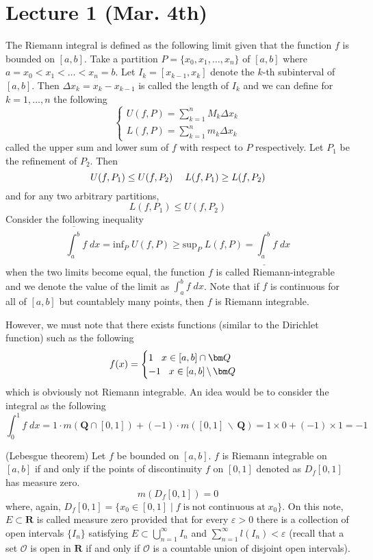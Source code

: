 \section{Lecture 1 (Mar. 4th)}
\begin{recall}
	The Riemann integral is defined as the following limit given that the function $f$ is bounded on $[a,b]$. Take a partition $P=\{x_0,x_1,\ldots ,x_{n}\}$ of $[a,b]$ where $a=x_0<x_1<\ldots <x_{n}=b$. Let $I_{k}=[x_{k-1},x_{k}]$ denote the $k$-th subinterval of $[a,b]$. Then $\Delta x_{k}=x_{k}-x_{k-1}$ is called the length of $I_{k}$ and we can define for $k=1,\ldots  ,n$ the following
\[\begin{cases}
U(f,P)=\sum_{k=1}^{n}M_{k}\Delta x_{k}\\
L(f,P)=\sum _{k=1}^{n}m_{k}\Delta x_{k}
\end{cases}\]
called the upper sum and lower sum of $f$ with respect to $P$ respectively. Let $P_1$ be the refinement of $P_2$. Then 
\[U(f,P_1)\leq U(f,P_2)\hspace{3ex}L(f,P_1)\geq L(f,P_2)\]
and for any two arbitrary partitions,
\[L(f,P_1)\leq U(f,P_2)\]
Consider the following inequality
\[\overline{\int_{a}^{b}}f\;dx=\mathrm{inf}_{P}\;U(f,P)\geq \mathrm{sup}_{P}\;L(f,P)=\underline{\int_{a}^{b}} f\;dx\]
when the two limits become equal, the function $f$ is called Riemann-integrable and we denote the value of the limit as $\int _{a}^{b}f\;dx$. Note that if $f$ is continuous for all of $[a,b]$ but countablely many points, then $f$ is Riemann integrable.

However, we must note that there exists functions (similar to the Dirichlet function) such as the following
\[f(x)=\begin{cases}
	1\hspace{2ex}x\in [a,b]\cap{\bm Q}\\
	-1\hspace{2ex}x\in [a,b]\,\backslash\,{\bm Q}
\end{cases}\]
which is obviously not Riemann integrable. An idea would be to consider the integral as the following
\[\int_{0}^{1}f\;dx=1\cdot m({\bm Q}\cap[0,1])+(-1)\cdot m([0,1]\,\backslash\,{\bm Q})=1\times 0+(-1)\times 1=-1\]
\end{recall}
\vspace{2ex}
\begin{thm}
	(Lebesgue theorem) Let $f$ be bounded on $[a,b]$. $f$ is Riemann integrable on $[a,b]$ if and only if the points of discontinuity $f$ on $[0,1]$ denoted as $D_{f}[0,1]$ has measure zero.
	\[m(D_{f}[0,1])=0\]
	where, again, $D_{f}[0,1]=\{x_0\in [0,1] \;|\;f\mathrm{\;is\;not\;continuous\;at\;}x_0 \}$. On this note, $E \subset {\bm R}$ is called measure zero provided that for every $\varepsilon >0$ there is a collection of open intervals $\{I_{n}\}$ satisfying $E\subset \bigcup^{\infty }_{n=1}I_{n}$ and $\sum _{n=1}^{\infty }l(I_{n})<\varepsilon $ (recall that a set $\mathcal{O}$ is open in ${\bm R}$ if and only if $\mathcal{O}$ is a countable union of disjoint open intervals). 
\end{thm}
